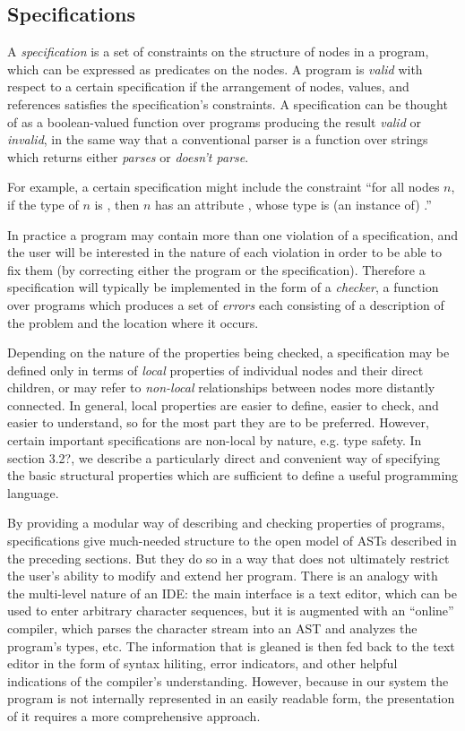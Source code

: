 \subsection{Specifications}
A \emph{specification} is a set of constraints on the structure of nodes in a program, which can be expressed as predicates on the nodes. A program is \emph{valid} with respect to a certain specification if the arrangement of nodes, values, and references satisfies the specification's constraints. A specification can be thought of as a boolean-valued function over programs producing the result \emph{valid} or \emph{invalid}, in the same way that a conventional parser is a function over strings which returns either \emph{parses} or \emph {doesn't parse}.

For example, a certain specification might include the constraint ``for all nodes $n$, if the type of $n$ is , then $n$ has an attribute , whose type is (an instance of) .''

In practice a program may contain more than one violation of a specification, and the user will be interested in the nature of each violation in order to be able to fix them (by correcting either the program or the specification). Therefore a specification will typically be implemented in the form of a \emph{checker}, a function over programs which produces a set of \emph{errors} each consisting of a description of the problem and the location where it occurs.

Depending on the nature of the properties being checked, a specification may be defined only in terms of \emph{local} properties of individual nodes and their direct children, or may refer to \emph{non-local} relationships between nodes more distantly connected. In general, local properties are easier to define, easier to check, and easier to understand, so for the most part they are to be preferred. However, certain important specifications are non-local by nature, e.g. type safety. In section 3.2?\todo{}, we describe a particularly direct and convenient way of specifying the basic structural properties which are sufficient to define a useful programming language.

By providing a modular way of describing and checking properties of programs, specifications give much-needed structure to the open model of ASTs described in the preceding sections. But they do so in a way that does not ultimately restrict the user's ability to modify and extend her program. There is an analogy with the multi-level nature of an IDE: the main interface is a text editor, which can be used to enter arbitrary character sequences, but it is augmented with an ``online'' compiler, which parses the character stream into an AST and analyzes the program's types, etc. The information that is gleaned is then fed back to the text editor in the form of syntax hiliting, error indicators, and other helpful indications of the compiler's understanding. However, because in our system the program is not internally represented in an easily readable form, the presentation of it requires a more comprehensive approach.


